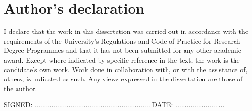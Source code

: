 \chapter*{Author's declaration}

I declare that the work in this dissertation was carried out in accordance with the requirements of the University's Regulations and Code of Practice for Research Degree Programmes and that it has not been submitted for any other academic award.
Except where indicated by specific reference in the text, the work is the candidate's own work.
Work done in collaboration with, or with the assistance of, others, is indicated as such. Any views expressed in the dissertation are those of the author.

\vspace{1cm}

SIGNED: ............................................................. \qquad DATE: ..........................
